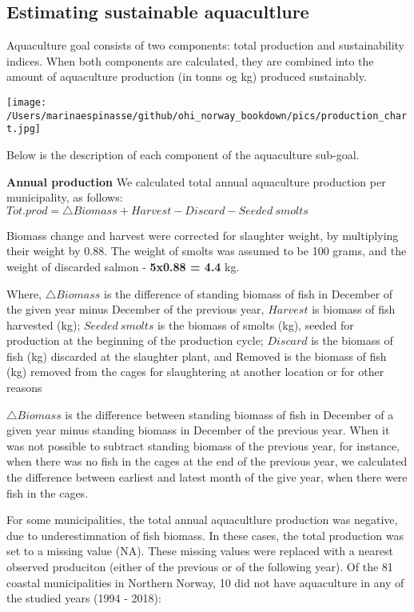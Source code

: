 \documentclass[
]{book}
\begin{document}
\hypertarget{estimating-sustainable-aquacultlure}{%
\subsection{Estimating sustainable aquacultlure}\label{estimating-sustainable-aquacultlure}}

Aquaculture goal consists of two components: total production and sustainability indices. When both components are calculated, they are combined into the amount of aquaculture production (in tonns og kg) produced sustainably.

\texttt{[image: /Users/marinaespinasse/github/ohi\_norway\_bookdown/pics/production\_chart.jpg]}

Below is the description of each component of the aquaculture sub-goal.

\textbf{Annual production}
We calculated total annual aquaculture production per municipality, as follows:
\(Tot.prod = \triangle Biomass + Harvest - Discard - Seeded\ smolts\)

Biomass change and harvest were corrected for slaughter weight, by multiplying their weight by 0.88.
The weight of smolts was assumed to be 100 grams, and the weight of discarded salmon - \textbf{5x0.88 = 4.4} kg.

Where, \(\triangle Biomass\) is the difference of standing biomass of fish in December of the given year minus December of the previous year, \(Harvest\) is biomass of fish harvested (kg); \(Seeded\ smolts\) is the biomass of smolts (kg), seeded for production at the beginning of the production cycle; \(Discard\) is the biomass of fish (kg) discarded at the slaughter plant, and Removed is the biomass of fish (kg) removed from the cages for slaughtering at another location or for other reasons

\(\triangle Biomass\) is the difference between standing biomass of fish in December of a given year minus standing biomass in December of the previous year. When it was not possible to subtract standing biomass of the previous year, for instance, when there was no fish in the cages at the end of the previous year, we calculated the difference between earliest and latest month of the give year, when there were fish in the cages.

For some municipalities, the total annual aquacultlure production was negative, due to underestimnation of fish biomass. In these cases, the total production was set to a missing value (NA). These missing values were replaced with a nearest observed produciton (either of the previous or of the following year).
Of the 81 coastal municipalities in Northern Norway, 10 did not have aquaculture in any of the studied years (1994 - 2018):
\end{document}
